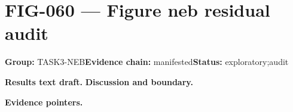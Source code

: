 \clearpage
\section{FIG-060 --- Figure neb residual audit}
\label{figpage:fig-060}
\textbf{Group:} TASK3-NEB\quad \textbf{Evidence chain:} manifested\quad \textbf{Status:} exploratory;audit

\textbf{Results text draft.} 
\textbf{Discussion and boundary.} 


\textbf{Evidence pointers.}



\vfill

